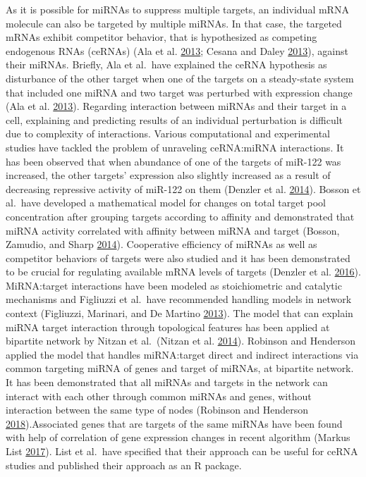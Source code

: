 \documentclass[a4,center,fleqn]{NAR}
\begin{document}
As it is possible for miRNAs to suppress multiple targets, an individual
mRNA molecule can also be targeted by multiple miRNAs. In that case, the
targeted mRNAs exhibit competitor behavior, that is hypothesized as
competing endogenous RNAs (ceRNAs) (Ala et al.
\protect\hyperlink{ref-ala_integrated_2013}{2013}; Cesana and Daley
\protect\hyperlink{ref-cesana_deciphering_2013}{2013}), against their
miRNAs. Briefly, Ala et al.~have explained the ceRNA hypothesis as
disturbance of the other target when one of the targets on a
steady-state system that included one miRNA and two target was perturbed
with expression change (Ala et al.
\protect\hyperlink{ref-ala_integrated_2013}{2013}). Regarding
interaction between miRNAs and their target in a cell, explaining and
predicting results of an individual perturbation is difficult due to
complexity of interactions. Various computational and experimental
studies have tackled the problem of unraveling ceRNA:miRNA interactions.
It has been observed that when abundance of one of the targets of
miR-122 was increased, the other targets' expression also slightly
increased as a result of decreasing repressive activity of miR-122 on
them (Denzler et al.
\protect\hyperlink{ref-denzler_assessing_2014}{2014}). Bosson et
al.~have developed a mathematical model for changes on total target pool
concentration after grouping targets according to affinity and
demonstrated that miRNA activity correlated with affinity between miRNA
and target (Bosson, Zamudio, and Sharp
\protect\hyperlink{ref-bosson_endogenous_2014}{2014}). Cooperative
efficiency of miRNAs as well as competitor behaviors of targets were
also studied and it has been demonstrated to be crucial for regulating
available mRNA levels of targets (Denzler et al.
\protect\hyperlink{ref-denzler_impact_2016}{2016}). MiRNA:target
interactions have been modeled as stoichiometric and catalytic
mechanisms and Figliuzzi et al.~have recommended handling models in
network context (Figliuzzi, Marinari, and De Martino
\protect\hyperlink{ref-figliuzzi_micrornas_2013}{2013}). The model that
can explain miRNA target interaction through topological features has
been applied at bipartite network by Nitzan et al.~(Nitzan et al.
\protect\hyperlink{ref-nitzan_interactions_2014}{2014}). Robinson and
Henderson applied the model that handles miRNA:target direct and
indirect interactions via common targeting miRNA of genes and target of
miRNAs, at bipartite network. It has been demonstrated that all miRNAs
and targets in the network can interact with each other through common
miRNAs and genes, without interaction between the same type of nodes
(Robinson and Henderson
\protect\hyperlink{ref-robinson_modelling_2018}{2018}).Associated genes
that are targets of the same miRNAs have been found with help of
correlation of gene expression changes in recent algorithm (Markus List
\protect\hyperlink{ref-markus_list_sponge_2017}{2017}). List et al.~have
specified that their approach can be useful for ceRNA studies and
published their approach as an R package.
\end{document}
